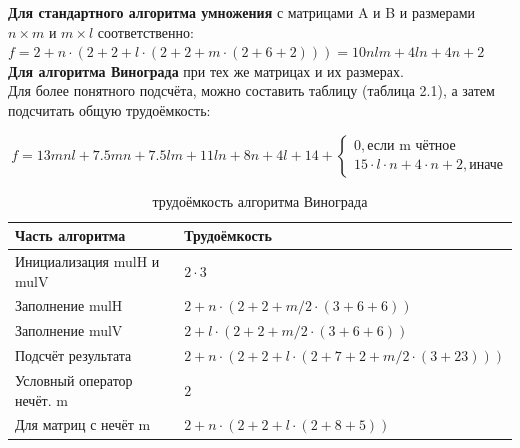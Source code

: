 \documentclass[12pt,a4paper]{report}
\begin{document}
\textbf{Для стандартного алгоритма умножения} с матрицами A и B и размерами $n\times m$ и $m\times l$ 
соответственно: \\

$f = 2 + n \cdot (2 + 2 + l \cdot (2 + 2 + m \cdot (2 + 6 + 2))) = 10nlm + 4ln  + 4n + 2$ \\

\textbf{Для алгоритма Винограда} при тех же матрицах и их размерах. \\

Для более понятного подсчёта, можно составить таблицу (таблица 2.1), а затем подсчитать общую трудоёмкость:

\begin{displaymath}
    f = 13mnl + 7.5mn + 7.5lm + 11ln + 8n + 4l + 14 + \left \{ 
    \begin{array}{ll}  
        0, \textrm{если m чётное} \\ 
        15 \cdot l \cdot n + 4 \cdot n + 2, \textrm{иначе} 
    \end{array} \right.
\end{displaymath}

\begin{table}[h]
\caption{трудоёмкость алгоритма Винограда}  
\label{tabular:timesandtenses}
\begin{center}
\begin{tabular}{ | l | l | }
\hline
    Часть алгоритма            & Трудоёмкость                                                        \\ \hline
    Инициализация mulH и mulV  & $2 \cdot 3$                                                         \\ \hline
    Заполнение mulH            & $2 + n \cdot (2 + 2 + m / 2 \cdot (3 + 6 + 6))$                     \\ \hline
    Заполнение mulV            & $2 + l \cdot (2 + 2 + m / 2 \cdot (3 + 6 + 6))$                     \\ \hline
    Подсчёт результата         & $2 + n \cdot (2 + 2 + l \cdot (2 + 7 + 2 + m / 2 \cdot (3 + 23)))$  \\ \hline
    Условный оператор нечёт. m & $2$                                                                 \\ \hline
    Для матриц с нечёт m       & $2 + n \cdot (2 + 2 + l \cdot (2 + 8 + 5))$                         \\ \hline
\end{tabular}
\end{center}
\end{table}
\end{document}
